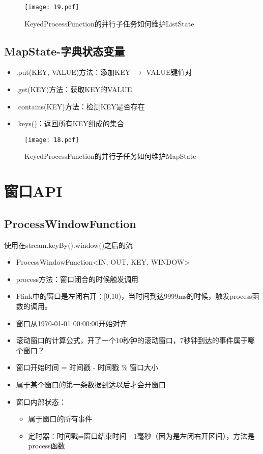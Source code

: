 \documentclass[cn,11pt,chinese]{elegantbook}
\begin{document}
\begin{figure}[htbp]
  \centering
  \texttt{[image: 19.pdf]}
  \caption{KeyedProcessFunction的并行子任务如何维护ListState}
\end{figure}

\subsection{MapState-字典状态变量}

\begin{itemize}
  \item .put(KEY, VALUE)方法：添加KEY $\rightarrow$ VALUE键值对
  \item .get(KEY)方法：获取KEY的VALUE
  \item .contains(KEY)方法：检测KEY是否存在
  \item .keys()：返回所有KEY组成的集合
\end{itemize}

\clearpage
\begin{figure}[htbp]
  \centering
  \texttt{[image: 18.pdf]}
  \caption{KeyedProcessFunction的并行子任务如何维护MapState}
\end{figure}

\section{窗口API}

\subsection{ProcessWindowFunction}

使用在stream.keyBy().window()之后的流

\begin{itemize}
  \item ProcessWindowFunction<IN, OUT, KEY, WINDOW>
  \item process方法：窗口闭合的时候触发调用
  \item Flink中的窗口是左闭右开：[0,10)，当时间到达9999ms的时候，触发process函数的调用。
  \item 窗口从1970-01-01 00:00:00开始对齐
  \item 滚动窗口的计算公式，开了一个10秒钟的滚动窗口，7秒钟到达的事件属于哪个窗口？
  \item 窗口开始时间 = 时间戳 - 时间戳 \;\% 窗口大小
  \item 属于某个窗口的第一条数据到达以后才会开窗口
  \item 窗口内部状态：
    \begin{itemize}
      \item 属于窗口的所有事件
      \item 定时器：时间戳=窗口结束时间 - 1毫秒（因为是左闭右开区间），方法是process函数
    \end{itemize}
\end{itemize}
\end{document}
